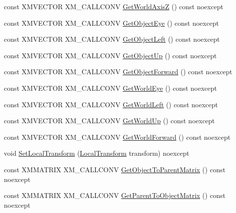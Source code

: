 \begin{DoxyCompactItemize}
\item 
const X\+M\+V\+E\+C\+T\+OR X\+M\+\_\+\+C\+A\+L\+L\+C\+O\+NV \hyperlink{classmage_1_1_transform_a7be63b8fa0f661504404c33572b1c66b}{Get\+World\+AxisZ} () const noexcept
\item 
const X\+M\+V\+E\+C\+T\+OR X\+M\+\_\+\+C\+A\+L\+L\+C\+O\+NV \hyperlink{classmage_1_1_transform_a1c2046b7035842501352665dbde6ab0a}{Get\+Object\+Eye} () const noexcept
\item 
const X\+M\+V\+E\+C\+T\+OR X\+M\+\_\+\+C\+A\+L\+L\+C\+O\+NV \hyperlink{classmage_1_1_transform_adb897f8d2c92b4310e5b0348fb0b6f49}{Get\+Object\+Left} () const noexcept
\item 
const X\+M\+V\+E\+C\+T\+OR X\+M\+\_\+\+C\+A\+L\+L\+C\+O\+NV \hyperlink{classmage_1_1_transform_a283898f735e7b4be4bfbb5df2a216f53}{Get\+Object\+Up} () const noexcept
\item 
const X\+M\+V\+E\+C\+T\+OR X\+M\+\_\+\+C\+A\+L\+L\+C\+O\+NV \hyperlink{classmage_1_1_transform_afcf3f671a33448e40de43ef3cbaeb510}{Get\+Object\+Forward} () const noexcept
\item 
const X\+M\+V\+E\+C\+T\+OR X\+M\+\_\+\+C\+A\+L\+L\+C\+O\+NV \hyperlink{classmage_1_1_transform_a695601318b2a68b70e48e3f910516ebd}{Get\+World\+Eye} () const noexcept
\item 
const X\+M\+V\+E\+C\+T\+OR X\+M\+\_\+\+C\+A\+L\+L\+C\+O\+NV \hyperlink{classmage_1_1_transform_a546bf5cf343810b3f3cbf6255661035b}{Get\+World\+Left} () const noexcept
\item 
const X\+M\+V\+E\+C\+T\+OR X\+M\+\_\+\+C\+A\+L\+L\+C\+O\+NV \hyperlink{classmage_1_1_transform_abf6416b5641ea511c26bdc9a7fac1aad}{Get\+World\+Up} () const noexcept
\item 
const X\+M\+V\+E\+C\+T\+OR X\+M\+\_\+\+C\+A\+L\+L\+C\+O\+NV \hyperlink{classmage_1_1_transform_aad9be5a54245e9352b660e6d95118755}{Get\+World\+Forward} () const noexcept
\item 
void \hyperlink{classmage_1_1_transform_aeefc74d980e060b30d43f77bd8c1801f}{Set\+Local\+Transform} (\hyperlink{classmage_1_1_local_transform}{Local\+Transform} transform) noexcept
\item 
const X\+M\+M\+A\+T\+R\+IX X\+M\+\_\+\+C\+A\+L\+L\+C\+O\+NV \hyperlink{classmage_1_1_transform_a9026a83f1441c9efefc7a67e005a833d}{Get\+Object\+To\+Parent\+Matrix} () const noexcept
\item 
const X\+M\+M\+A\+T\+R\+IX X\+M\+\_\+\+C\+A\+L\+L\+C\+O\+NV \hyperlink{classmage_1_1_transform_a89ea42ba5daef39d8683bb69847d275e}{Get\+Parent\+To\+Object\+Matrix} () const noexcept

\end{DoxyCompactItemize}
